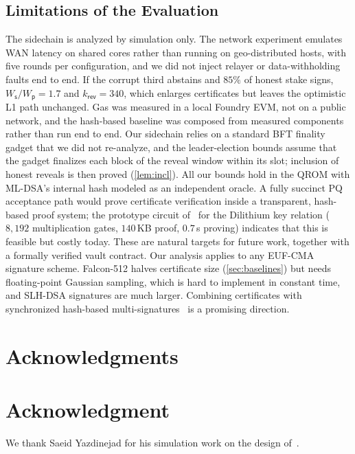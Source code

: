 \documentclass[10pt,journal,compsoc]{IEEEtran}
\theoremstyle{tplain}
\theoremstyle{tdef}
\theoremstyle{remark}
\newcommand{\Ws}{W_{\mathsf{s}}}
\newcommand{\Wp}{W_{\mathsf{p}}}
\newcommand{\kr}{k_{\mathsf{rev}}}
\begin{document}
\subsection{Limitations of the Evaluation}\label{S-disc-limits}
The sidechain is analyzed by simulation only. The network experiment emulates WAN latency on shared cores rather than running on geo-distributed hosts, with five rounds per configuration, and we did not inject relayer or data-withholding faults end to end. If the corrupt third abstains and $85\%$ of honest stake signs, $\Ws/\Wp=1.7$ and $\kr=340$, which enlarges certificates but leaves the optimistic L1 path unchanged. Gas was measured in a local Foundry EVM, not on a public network, and the hash-based baseline was composed from measured components rather than run end to end. Our sidechain relies on a standard BFT finality gadget that we did not re-analyze, and the leader-election bounds assume that the gadget finalizes each block of the reveal window within its slot; inclusion of honest reveals is then proved (\cref{lem:incl}). All our bounds hold in the QROM with ML-DSA's internal hash modeled as an independent oracle. A fully succinct PQ acceptance path would prove certificate verification inside a transparent, hash-based proof system; the prototype circuit of~\cite{NIROPoK2025} for the Dilithium key relation ($8{,}192$ multiplication gates, $140$\,KB proof, $0.7$\,s proving) indicates that this is feasible but costly today. These are natural targets for future work, together with a formally verified vault contract. Our analysis applies to any EUF-CMA signature scheme. Falcon-512 halves certificate size (\cref{sec:baselines}) but needs floating-point Gaussian sampling, which is hard to implement in constant time, and SLH-DSA signatures are much larger. Combining certificates with synchronized hash-based multi-signatures~\cite{drake2025hashsig} is a promising direction.

\ifCLASSOPTIONcompsoc
\section*{Acknowledgments}
\else
\section*{Acknowledgment}
\fi
We thank Saeid Yazdinejad for his simulation work on the design of~\cite{myeprint}.



\end{document}
